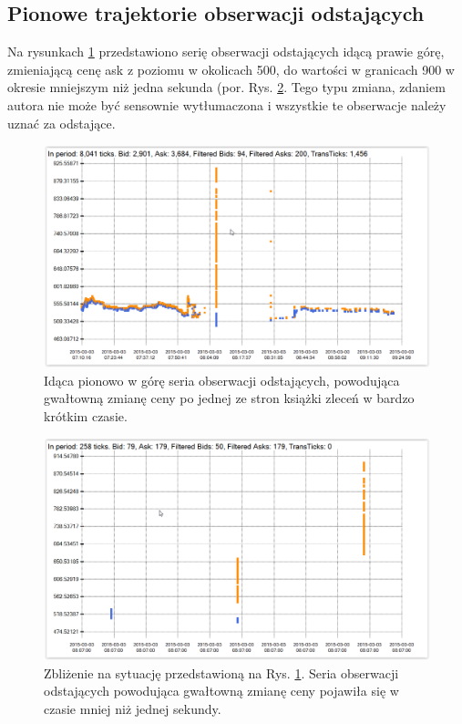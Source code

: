 \documentclass[a4paper,12pt,openany, DIV=calc, headsepline]{scrbook}
\begin{document}
\subsection{Pionowe trajektorie obserwacji odstających}

Na rysunkach \ref{fig:fCNH15} przedstawiono serię obserwacji odstających idącą prawie górę, zmieniającą cenę ask z poziomu w okolicach 500, do wartości w granicach 900 w okresie mniejszym niż jedna sekunda (por. Rys. \ref{fig:fCNH15ZOOM}. Tego typu zmiana, zdaniem autora nie może być sensownie wytłumaczona i wszystkie te obserwacje należy uznać za odstające.

\begin{figure}[H]
  \centering
  \includegraphics[scale=0.5]{wykresy/fCNH15.PNG}
  \caption{Idąca pionowo w górę seria obserwacji odstających, powodująca gwałtowną zmianę ceny po jednej ze stron książki zleceń w bardzo krótkim czasie.}
  \label{fig:fCNH15}
\end{figure}

\begin{figure}[H]
  \centering
  \includegraphics[scale=0.5]{wykresy/fCNH15ZOOM.PNG}
  \caption{Zbliżenie na sytuację przedstawioną na Rys. \ref{fig:fCNH15}. Seria obserwacji odstających powodująca gwałtowną zmianę ceny pojawiła się w czasie mniej niż jednej sekundy.}
  \label{fig:fCNH15ZOOM}
\end{figure}
\end{document}
